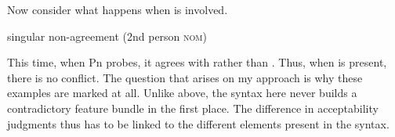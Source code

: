 \documentclass[output=paper]{langscibook}
\begin{document}
Now consider what happens when \sti is involved. 


\ea {}
    \ex[]
    {
        \gll Mér leiddist hún. \\
            me\dat{} bored\gl{1/2/3sg} she\gl{sg} \\
        \glt `I found her boring.' \citep[16]{SigOnt} %
    }
\z
\z


\ea \datnom{} singular \sti non-agreement (2nd person \textsc{nom})\smallskip\\
\z

This time, when Pn probes, it agrees with \sti rather than . Thus, when \sti is present, there is no conflict. The question that arises on my approach is why these examples are marked at all. Unlike above, the syntax here never builds a contradictory feature bundle in the first place. The difference in acceptability judgments thus has to be linked to the different elements present in the syntax.
\end{document}
